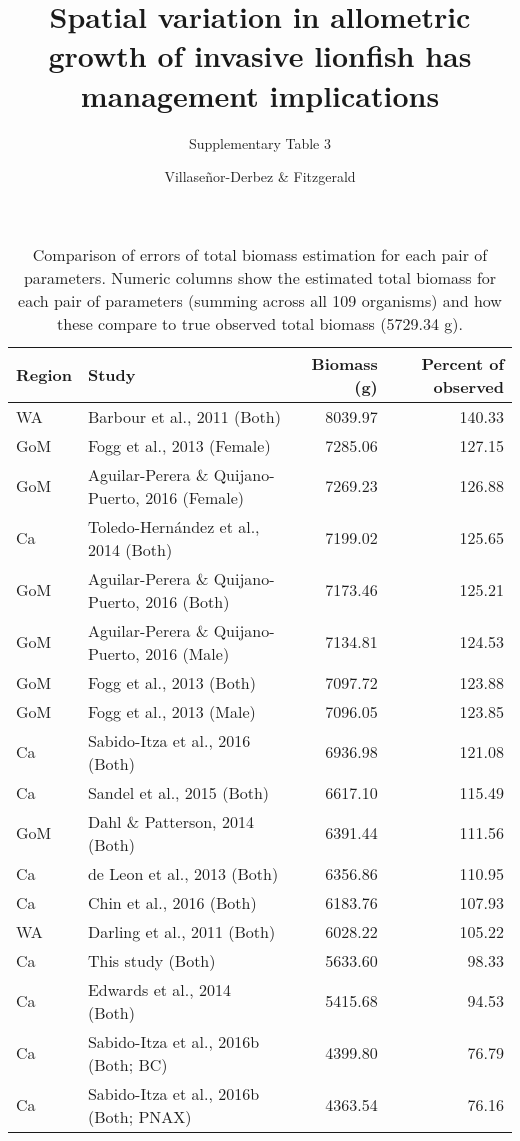 \documentclass[12pt,]{article}
\title{Spatial variation in allometric growth of invasive lionfish has management implications}
\subtitle{Supplementary Table 3}
\author{Villaseñor-Derbez \& Fitzgerald}
\date{}
\begin{document}
\maketitle

\begin{table}[H]

\caption{\label{tab:unnamed-chunk-3}\label{tab:errors}Comparison of errors of total biomass estimation for each pair of parameters. Numeric columns show the estimated total biomass for each pair of parameters (summing across all 109 organisms) and how these compare to true observed total biomass (5729.34 g).}
\centering
\begin{tabular}{llrr}
\toprule
Region & Study & Biomass (g) & Percent of observed\\
\midrule
WA & Barbour et al., 2011 (Both) & 8039.97 & 140.33\\
GoM & Fogg et al., 2013 (Female) & 7285.06 & 127.15\\
GoM & Aguilar-Perera \& Quijano-Puerto, 2016 (Female) & 7269.23 & 126.88\\
Ca & Toledo-Hernández et al., 2014 (Both) & 7199.02 & 125.65\\
GoM & Aguilar-Perera \& Quijano-Puerto, 2016 (Both) & 7173.46 & 125.21\\
\addlinespace
GoM & Aguilar-Perera \& Quijano-Puerto, 2016 (Male) & 7134.81 & 124.53\\
GoM & Fogg et al., 2013 (Both) & 7097.72 & 123.88\\
GoM & Fogg et al., 2013 (Male) & 7096.05 & 123.85\\
Ca & Sabido-Itza et al., 2016 (Both) & 6936.98 & 121.08\\
Ca & Sandel et al., 2015 (Both) & 6617.10 & 115.49\\
\addlinespace
GoM & Dahl \& Patterson, 2014 (Both) & 6391.44 & 111.56\\
Ca & de Leon et al., 2013 (Both) & 6356.86 & 110.95\\
Ca & Chin et al., 2016 (Both) & 6183.76 & 107.93\\
WA & Darling et al., 2011 (Both) & 6028.22 & 105.22\\
Ca & This study (Both) & 5633.60 & 98.33\\
\addlinespace
Ca & Edwards et al., 2014 (Both) & 5415.68 & 94.53\\
Ca & Sabido-Itza et al., 2016b (Both; BC) & 4399.80 & 76.79\\
Ca & Sabido-Itza et al., 2016b (Both; PNAX) & 4363.54 & 76.16\\
\bottomrule
\end{tabular}
\end{table}
\end{document}
